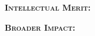 
\chapter{\thetitle}

\textbf{\textsc{Intellectual Merit:}}

\textbf{\textsc{Broader Impact:}}

\clearpage
